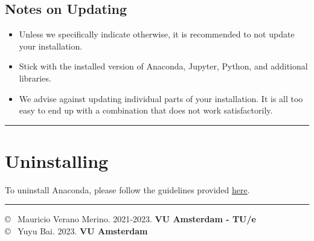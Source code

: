 \documentclass{latex-template/tufte-handout}
\begin{document}
\subsection{Notes on Updating}\label{notes-on-updating}

\begin{itemize}
	\item Unless we specifically indicate otherwise, it is recommended to not update your installation.
	\item Stick with the installed version of Anaconda, Jupyter, Python, and additional libraries.
	\item We advise against updating individual parts of your installation. It is all too easy to end up with a combination that does not work satisfactorily.
\end{itemize}

\begin{center}\rule{\linewidth}{0.5pt}\end{center}


\section{Uninstalling}\label{uninstalling}

To uninstall Anaconda, please follow the guidelines provided
\href{https://docs.anaconda.com/anaconda/install/uninstall}{here}.

    \begin{center}\rule{\linewidth}{0.5pt}\end{center}



\copyright~ Mauricio Verano Merino. 2021-2023. \textbf{VU Amsterdam - TU/e}\\
\copyright~ Yuyu Bai. 2023. \textbf{VU Amsterdam}
\end{document}
